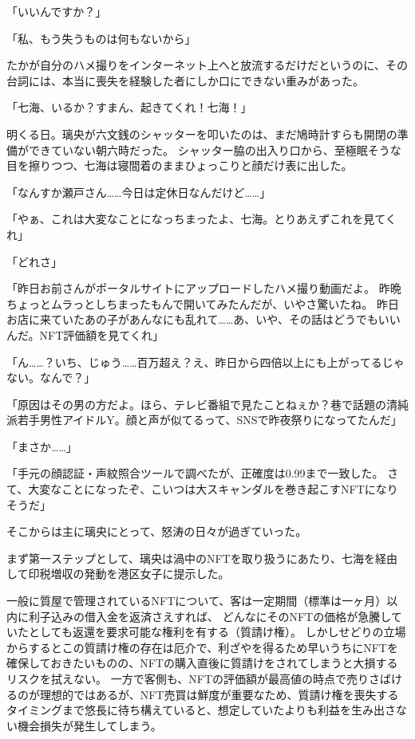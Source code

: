 「いいんですか？」

「私、もう失うものは何もないから」

たかが自分のハメ撮りをインターネット上へと放流するだけだというのに、その台詞には、本当に喪失を経験した者にしか口にできない重みがあった。

\sectionbreak

「七海、いるか？すまん、起きてくれ！七海！」

明くる日。璃央が六文銭のシャッターを叩いたのは、まだ鳩時計すらも開閉の準備ができていない朝六時だった。
シャッター脇の出入り口から、至極眠そうな目を擦りつつ、七海は寝間着のままひょっこりと顔だけ表に出した。

「なんすか瀬戸さん……今日は定休日なんだけど……」

「やぁ、これは大変なことになっちまったよ、七海。とりあえずこれを見てくれ」

「どれさ」

「昨日お前さんがポータルサイトにアップロードしたハメ撮り動画だよ。
昨晩ちょっとムラっとしちまったもんで開いてみたんだが、いやさ驚いたね。
昨日お店に来ていたあの子があんなにも乱れて……あ、いや、その話はどうでもいいんだ。NFT評価額を見てくれ」

「ん……？いち、じゅう……百万超え？え、昨日から四倍以上にも上がってるじゃない。なんで？」

「原因はその男の方だよ。ほら、テレビ番組で見たことねぇか？巷で話題の清純派若手男性アイドルY。顔と声が似てるって、SNSで昨夜祭りになってたんだ」

「まさか……」

「手元の顔認証・声紋照合ツールで調べたが、正確度は0.99まで一致した。
さて、大変なことになったぞ、こいつは大スキャンダルを巻き起こすNFTになりそうだ」

そこからは主に璃央にとって、怒涛の日々が過ぎていった。

まず第一ステップとして、璃央は渦中のNFTを取り扱うにあたり、七海を経由して印税増収の発動を港区女子に提示した。

一般に質屋で管理されているNFTについて、客は一定期間（標準は一ヶ月）以内に利子込みの借入金を返済さえすれば、
どんなにそのNFTの価格が急騰していたとしても返還を要求可能な権利を有する（質請け権）。
しかしせどりの立場からするとこの質請け権の存在は厄介で、利ざやを得るため早いうちにNFTを確保しておきたいものの、NFTの購入直後に質請けをされてしまうと大損するリスクを拭えない。
一方で客側も、NFTの評価額が最高値の時点で売りさばけるのが理想的ではあるが、NFT売買は鮮度が重要なため、質請け権を喪失するタイミングまで悠長に待ち構えていると、想定していたよりも利益を生み出さない機会損失が発生してしまう。

